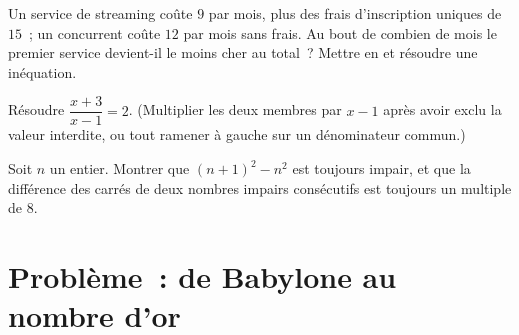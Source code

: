 \begin{exercise}[$\star\star$]\label{exo:g10:algebra:9}
Un service de streaming coûte $9$ par mois, plus des frais d'inscription
uniques de $15$~; un concurrent coûte $12$ par mois sans frais. Au bout de
combien de mois le premier service devient-il le moins cher au total~?
Mettre en  et résoudre une inéquation.
\end{exercise}

\begin{exercise}[$\star\star$]\label{exo:g10:algebra:10}
Résoudre $\dfrac{x+3}{x-1} = 2$. (Multiplier les deux membres par $x - 1$
après avoir exclu la valeur interdite, ou tout ramener à gauche sur un
dénominateur commun.)
\end{exercise}

\begin{exercise}[$\star\star\star$]\label{exo:g10:algebra:11}
Soit $n$ un entier. Montrer que $(n + 1)^2 - n^2$ est toujours impair, et
que la différence des carrés de deux nombres impairs consécutifs est
toujours un multiple de $8$.
\end{exercise}

\section{Problème~: de Babylone au nombre d'or}

